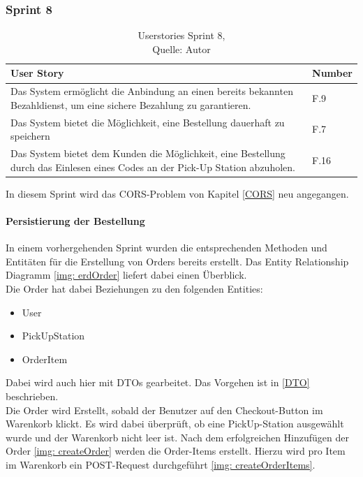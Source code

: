 \subsubsection{Sprint 8}\label{sprint8}
\begin{table}[H]
	\setlength\extrarowheight{2pt} %
	\begin{tabularx}{\textwidth}{|X|l|}
		\hline
		\textbf{User Story} & \textbf{Number} \\
		\hline
		Das System ermöglicht die Anbindung an einen bereits bekannten Bezahldienst, um eine sichere Bezahlung zu garantieren.  & F.9\\
		\hline
		Das System bietet die Möglichkeit, eine Bestellung dauerhaft zu speichern& F.7\\
		\hline
		Das System bietet dem Kunden die Möglichkeit, eine Bestellung durch das Einlesen eines Codes an der Pick-Up Station abzuholen.  & F.16\\
		\hline
	\end{tabularx} 
	\caption[Userstories Sprint 8]{Userstories Sprint 8,\\ Quelle: Autor}
\end{table}\label{userStoriesSprint8}
In diesem Sprint wird das CORS-Problem von Kapitel \ref{CORS} neu angegangen. 

\paragraph{Persistierung der Bestellung}
In einem vorhergehenden Sprint wurden die entsprechenden Methoden und Entitäten für die Erstellung von Orders bereits erstellt. Das Entity Relationship Diagramm \ref{img: erdOrder} liefert dabei einen Überblick. \\
Die Order hat dabei Beziehungen zu den folgenden Entities: 
\begin{itemize}
	\item User
	\item PickUpStation
	\item OrderItem
\end{itemize}
Dabei wird auch hier mit DTOs gearbeitet. Das Vorgehen ist in \ref{DTO} beschrieben. \\
Die Order wird Erstellt, sobald der Benutzer auf den Checkout-Button im Warenkorb klickt. Es wird dabei überprüft, ob eine PickUp-Station ausgewählt wurde und der Warenkorb nicht leer ist. Nach dem erfolgreichen Hinzufügen der Order \ref{img: createOrder} werden die Order-Items erstellt. Hierzu wird pro Item im Warenkorb ein POST-Request durchgeführt \ref{img: createOrderItems}. 

